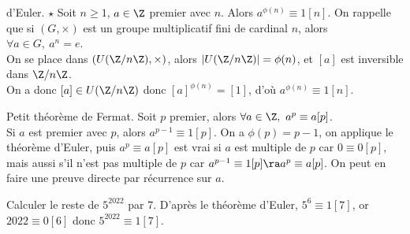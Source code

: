 \documentclass[11pt]{article}
\begin{document}
\vspace*{-0.8cm}

\begin{thm}{d'Euler. $\star$}{}
    Soit $n\geq1$, $a\in\Z$ premier avec $n$. Alors $a^{\phi(n)}\equiv1[n]$.
    \tcblower
    On rappelle que si $(G,\times)$ est un groupe multiplicatif fini de cardinal $n$, alors $\forall a \in G, ~ a^n = e$.\\
    On se place dans $(U(\Z/n\Z),\times)$, alors $|U(\Z/n\Z)|=\phi(n)$, et $[a]$ est inversible dans $\Z/n\Z$.\\
    On a donc $[a]\in U(\Z/n\Z)$ donc $[a]^{\phi(n)}=[1]$, d'où $a^{\phi(n)}\equiv 1[n]$.
\end{thm}

\vspace*{-0.8cm}

\begin{prop}{Petit théorème de Fermat.}{}
    Soit $p$ premier, alors $\forall a \in \Z, ~ a^{p}\equiv a[p]$.\\
    Si $a$ est premier avec $p$, alors $a^{p-1}\equiv1[p]$.
    \tcblower
    On a $\phi(p)=p-1$, on applique le théorème d'Euler, puis $a^p\equiv a[p]$ est vrai si $a$ est multiple de $p$ car $0\equiv0[p]$, mais aussi s'il n'est pas multiple de $p$ car $a^{p-1}\equiv1[p]\ra a^p\equiv a[p]$.\n
    On peut en faire une preuve directe par récurrence sur $a$. 
\end{prop}

\vspace*{-0.5cm}

\begin{ex}{}{}
    Calculer le reste de $5^{2022}$ par 7.
    \tcblower
    D'après le théorème d'Euler, $5^6\equiv1[7]$, or $2022\equiv0[6]$ donc $5^{2022}\equiv1[7]$.
\end{ex}

\vspace*{-0.5cm}
\end{document}
